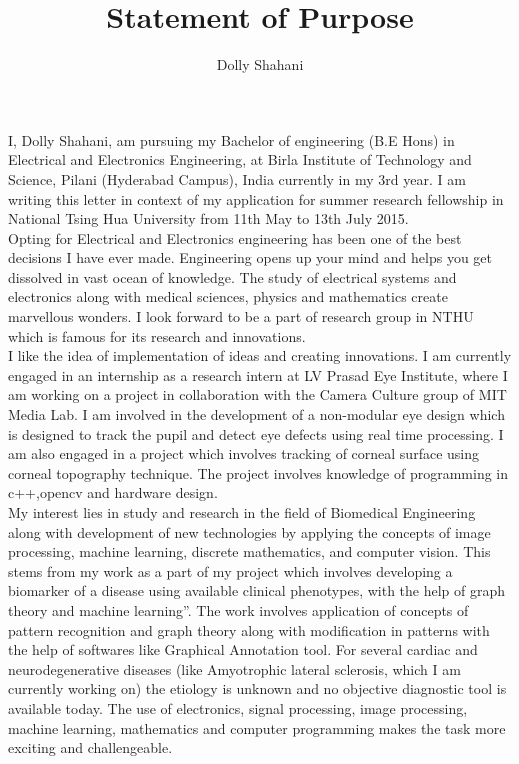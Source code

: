 \documentclass[12pt]{article}
\title{Statement of Purpose}
\author{Dolly Shahani}
\date{}
\begin{document}
\maketitle



I, Dolly Shahani, am pursuing my Bachelor of engineering (B.E Hons) in Electrical and Electronics Engineering, at Birla Institute of Technology and Science, Pilani (Hyderabad Campus), India currently in my 3rd year. I am writing this letter in context of my application for summer research fellowship in National Tsing Hua University from 11th May to 13th July 2015.\\

Opting for Electrical and Electronics engineering has been one of the best decisions I have ever made. Engineering opens up your mind and helps you get dissolved in vast ocean of knowledge. The study of electrical systems and electronics along with medical sciences, physics and mathematics create marvellous wonders. I look forward to be a part of research group in NTHU which is famous for its research and innovations.\\

I like the idea of implementation of ideas and creating innovations. 
I am currently engaged in an internship as a research intern at LV Prasad Eye Institute, where I am working on a project in collaboration with  the Camera Culture group of MIT Media Lab. I am involved in the development of a non-modular eye design which is designed to track the pupil and detect eye defects using real time processing. I am also engaged in a project which involves tracking of corneal surface using corneal topography technique. The project involves knowledge of programming in c++,opencv and hardware design.\\

My interest lies in study and research in the field of Biomedical Engineering along with development of new technologies by applying the concepts of image processing, machine learning, discrete mathematics, and computer vision. This stems from my work as a part of my project which involves developing a biomarker of a disease using available clinical phenotypes, with the help of graph theory and machine learning”. The work involves application of concepts of pattern recognition and graph theory along with modification in patterns with the help of softwares like Graphical Annotation tool. For several cardiac and neurodegenerative diseases (like Amyotrophic lateral sclerosis, which I am currently working on) the etiology is unknown and no objective diagnostic tool is available today. The use of electronics, signal processing, image processing, machine learning, mathematics and computer programming makes the task more exciting and challengeable. \\
\end{document}
